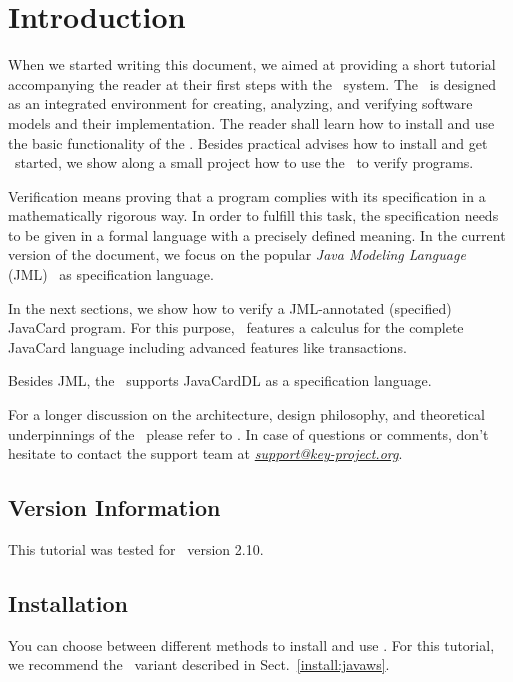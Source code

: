 \section{Introduction}
\label{sec:introduction}

When we started writing this document, we aimed at providing a short
tutorial accompanying the reader at their first steps with the \KeY\
system. The \kt\ is designed as an integrated environment for
creating, analyzing, and verifying software models and their
implementation. The reader shall learn how to install and use the
basic functionality of the \kt. Besides practical advises how to
install and get \KeY\ started, we show along a small project how to
use the \kt\ to verify programs.

Verification means proving that a program complies with its specification
in a mathematically rigorous way. In order to fulfill this task, the
specification needs to be given in a formal language with a precisely
defined meaning. In the current version of the document, we focus on
the popular \emph{Java Modeling Language}
(JML)~\cite{JMLReferenceManual11,Leavens-Baker-Ruby04} as specification
language.

In the next sections, we show how to verify a JML-annotated (specified)
Java\-Card program. For this purpose, \KeY\ features a calculus for the complete
Java\-Card language including advanced features like transactions.

Besides JML, the \kt\ supports Java\-Card\-DL as a specification
language. 

For a longer discussion on the architecture, design philosophy, and
theoretical underpinnings of the \kt\, please refer to
\cite{KeYBook2016}.
%
In case of questions or comments, don't hesitate to contact the
\KeY support team at 
\href{mailto:support@key-project.org}{\emph{support@key-project.org}}.

\subsection{Version Information}
\label{sec:version}

This tutorial was tested for \KeY\ version 2.10.

\subsection{Installation}
\label{sec:install}

You can choose between different methods to install and use \KeY.
For this tutorial, we
recommend the \javaWS\ variant described in
Sect.~\ref{install:javaws}. 

